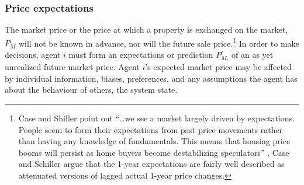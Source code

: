 {\subsubsection{Price expectations}
The \gls{market price} or the price at which a property is exchanged on the market, $P_M$ will not be known in advance, nor will the future sale price.\footnote{Case and Shiller point out ``\dots we see a market largely driven by expectations. People seem to form their expectations from past price movements rather than having any knowledge of fundamentals. This means that housing price booms will persist as home buyers become destabilizing speculators''  \cite{caseThereBubbleHousing2003}. Case and Schiller\cite{caseThereBubbleHousing2003} argue that  the 1-year expectations are fairly well described as attenuated versions of lagged actual 1-year price changes.}  In order to make decisions, agent $i$ must form an \glspl{expectation} or prediction $P_{M_i}^{\epsilon}$ of an as yet unrealized future market price. Agent $i$'s expected market price may be affected by individual information, biases, preferences, and any assumptions the agent has about the behaviour of others, the system state.  




}

